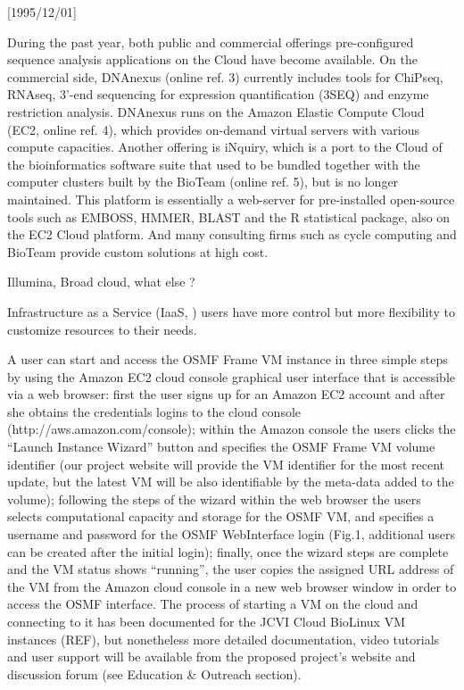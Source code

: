 \NeedsTeXFormat{LaTeX2e}[1995/12/01] \documentclass[10pt]{bmc_article}
\newenvironment{bmcformat}{\begin{raggedright}\baselineskip20pt\sloppy\setboolean{publ}{false}}{\end{raggedright}\baselineskip20pt\sloppy}
\begin{document}
\begin{bmcformat}
During the past year, both public and commercial offerings pre-configured sequence analysis applications on
the Cloud have become available. On the commercial side, DNAnexus (online ref.  3) currently includes tools
for ChiPseq, RNAseq, 3'-end sequencing for expression quantification (3SEQ) and enzyme restriction analysis.
DNAnexus runs on the Amazon Elastic Compute Cloud (EC2, online ref. 4), which provides on-demand virtual
servers with various compute capacities. Another offering is iNquiry, which is a port to the Cloud of the
bioinformatics software suite that used to be bundled together with the computer clusters built by the BioTeam
(online ref. 5), but is no longer maintained. This platform is essentially a web-server for pre-installed
open-source tools such as EMBOSS, HMMER, BLAST and the R statistical package, also on the EC2 Cloud platform.
And many consulting firms such as cycle computing and BioTeam provide custom solutions at high cost.

Illumina, Broad cloud, what else ?

Infrastructure as a Service (IaaS, \cite{}) users have more control but more flexibility to customize resources
to their needs.

A user can start and access the OSMF Frame VM instance in three simple steps by using the Amazon EC2 cloud console graphical user interface that is accessible via a web browser: first the user signs up for an Amazon EC2 account and after she obtains the credentials logins to the cloud console (http://aws.amazon.com/console);  within the Amazon console the users clicks the “Launch Instance Wizard” button and specifies the OSMF Frame VM volume identifier (our project website will provide the VM identifier for the most recent update, but the latest VM will be also identifiable by the meta-data added to the volume); following the steps of the wizard within the web browser the users selects computational capacity and storage for the OSMF VM, and specifies a username and password for the OSMF WebInterface login (Fig.1, additional users can be created after the initial login); finally, once the wizard steps are complete and the VM status shows “running”, the user copies the assigned URL address of the VM from the Amazon cloud console in a new web browser window in order to access the OSMF interface. The process of starting a VM on the cloud and connecting to it has been documented for the JCVI Cloud BioLinux VM instances (REF), but nonetheless more detailed documentation, video tutorials and user support will be available from the proposed project's website and discussion forum (see Education & Outreach section).



\end{bmcformat}
\end{document}
